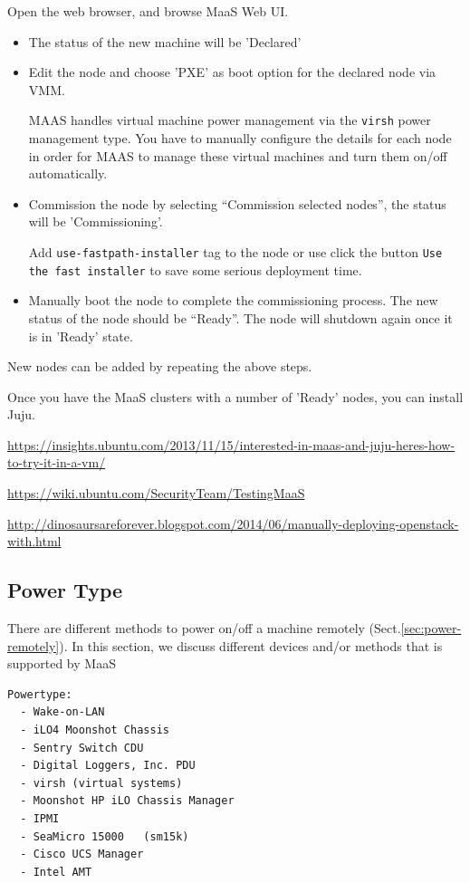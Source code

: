  Open the web browser, and browse MaaS Web UI.
 \begin{itemize}
   \item The status of the new machine will be 'Declared'
   \item Edit the node and choose 'PXE' as boot option for the declared node via
   VMM.
   
   MAAS handles virtual machine power management via the \verb!virsh! power
   management type. You have to manually configure the details for each node in
   order for MAAS to manage these virtual machines and turn them on/off
   automatically. 
   
   \item Commission the node by selecting ``Commission selected nodes'', the
   status will be 'Commissioning'. 
   
   Add \verb!use-fastpath-installer! tag to the node or use click the button
   \verb!Use the fast installer! to save some serious deployment time.
   
   \item Manually boot the node to complete the   commissioning process. The new
   status of the node should be ``Ready''. The node will shutdown again once it
   is in 'Ready' state.
 \end{itemize}
 New nodes can be added by repeating the above steps.
 
Once you have the MaaS clusters with a number of 'Ready' nodes, you can install
Juju.


\url{https://insights.ubuntu.com/2013/11/15/interested-in-maas-and-juju-heres-how-to-try-it-in-a-vm/}

\url{https://wiki.ubuntu.com/SecurityTeam/TestingMaaS}

\url{http://dinosaursareforever.blogspot.com/2014/06/manually-deploying-openstack-with.html}

\subsection{Power Type}
\label{sec:MaaS_powertype}

There are different methods to power on/off a machine remotely
(Sect.\ref{sec:power-remotely}). In this section, we discuss different devices
and/or methods that is supported by MaaS

\begin{verbatim}
Powertype: 
  - Wake-on-LAN
  - iLO4 Moonshot Chassis
  - Sentry Switch CDU
  - Digital Loggers, Inc. PDU
  - virsh (virtual systems)  
  - Moonshot HP iLO Chassis Manager
  - IPMI
  - SeaMicro 15000   (sm15k)
  - Cisco UCS Manager
  - Intel AMT
\end{verbatim}

